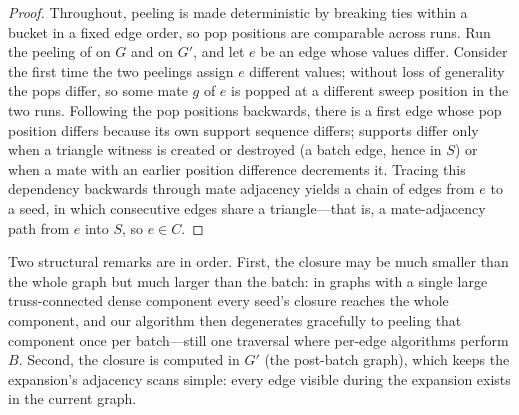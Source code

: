 \begin{proof}
Throughout, peeling is made deterministic by breaking ties within a bucket in a fixed edge order, so pop positions are comparable across runs.
Run the peeling of  on $G$ and on $G'$, and let $e$ be an edge whose values differ.
Consider the first time the two peelings assign $e$ different values; without loss of generality the pops differ, so some mate $g$ of $e$ is popped at a different sweep position in the two runs.
Following the pop positions backwards, there is a first edge whose pop position differs because its own support sequence differs; supports differ only when a triangle witness is created or destroyed (a batch edge, hence in $S$) or when a mate with an earlier position difference decrements it.
Tracing this dependency backwards through mate adjacency yields a chain of edges from $e$ to a seed, in which consecutive edges share a triangle---that is, a mate-adjacency path from $e$ into $S$, so $e\in C$.
\end{proof}

Two structural remarks are in order.
First, the closure may be much smaller than the whole graph but much larger than the batch: in graphs with a single large truss-connected dense component every seed's closure reaches the whole component, and our algorithm then degenerates gracefully to peeling that component once per batch---still one traversal where per-edge algorithms perform $B$.
Second, the closure is computed in $G'$ (the post-batch graph), which keeps the expansion's adjacency scans simple: every edge visible during the expansion exists in the current graph.
